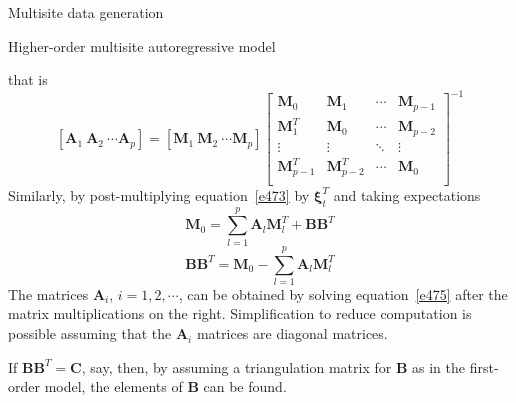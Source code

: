 \documentclass[8pt]{beamer}
\newcommand{\ve}[1]{\boldsymbol{#1}}
\begin{document}
\begin{frame}{Multisite data generation}
    \begin{block}{Higher-order multisite autoregressive model}
    \end{block}
    that is
    \begin{equation}
    \left[\mathbf{A}_1\ \mathbf{A}_2\ \cdots \mathbf{A}_p \right] =  \left[\mathbf{M}_1\ \mathbf{M}_2\ \cdots \mathbf{M}_p \right] 
\begin{bmatrix}
    \mathbf{M}_0 & \mathbf{M}_1   & \cdots & \mathbf{M}_{p-1} \\
    \mathbf{M}_1^T & \mathbf{M}_0   & \cdots & \mathbf{M}_{p-2} \\
    \vdots &  \vdots & \ddots & \vdots \\
    \mathbf{M}_{p-1}^T & \mathbf{M}_{p-2}^T  & \cdots & \mathbf{M}_0 \\
\end{bmatrix}^{-1}
\label{e475}
    \end{equation}
Similarly, by post-multiplying equation~\ref{e473} by $\ve{\xi}_t^T$ and taking expectations
    \begin{equation*}
        \mathbf{M}_0 = \sum_{l=1}^{p} \mathbf{A}_l \mathbf{M}_{l}^T + \mathbf{B}\mathbf{B}^T
    \end{equation*}
\begin{equation}
        \mathbf{B}\mathbf{B}^T = \mathbf{M}_0 - \sum_{l=1}^{p} \mathbf{A}_l \mathbf{M}_{l}^T  
        \label{e476}
    \end{equation}
    The matrices $\mathbf{A}_i$, $i=1,2, \cdots$, can be obtained by solving equation~\ref{e475} after the matrix multiplications on the right. Simplification to reduce computation is possible assuming that the $\mathbf{A}_i$ matrices are diagonal matrices.

    If $\mathbf{B} \mathbf{B}^T = \mathbf{C}$, say, then, by assuming a triangulation matrix for $\mathbf{B}$ as in the first-order model, the elements of $\mathbf{B}$ can be found. 
\end{frame}
\end{document}
